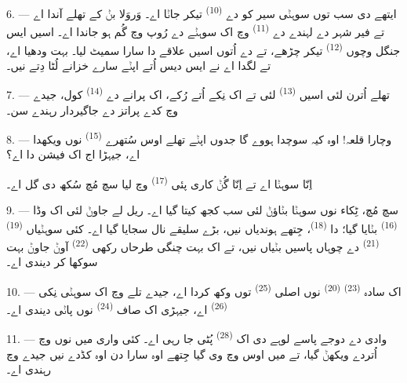 \VUsaut{3.0mm}
\VUsaut{3.0mm}

6. --- ایتھے دی سب توں سوہݨی سیر کو دے  \textsuperscript{(10)} تیکر
جاݨا اے۔  وَروَلا بݨ کے تھلے آندا اے تے فیر شہر دے لہندے دے
 \textsuperscript{(11)} وچ اک سوہݨے  دے رُوپ وچ
گُم ہو جاندا اے۔ اسیں ایس جنگل وچوں  \textsuperscript{(12)}
تیکر چڑھے، تے  دے اُتوں اسیں علاقے دا سارا 
سمیٹ لیا۔  بہت ودھیا اے، تے لگدا اے  نے ایس دیس
اُتے اپݨے سارے خزانے لُٹا دِتے نیں۔

7. --- تھلے اُترن لئی اسیں  \textsuperscript{(13)} لئی تے اک
نِکے  اُتے رُکے، اک پرانے  دے
 \textsuperscript{(14)} کول، جیدے وچ کدے پراتز دے جاگیردار رہندے سن۔

8. --- وچارا قلعہ! اوہ کیہ سوچدا ہووے گا جدوں اپݨے تھلے اوس سُتھرے
 \textsuperscript{(15)} نوں ویکھدا اے، جیہڑا اج اک فیشن دا
 اے؟

 اِنّا سوہݨا اے تے  اِنّا گُݨ کاری پئی
 \textsuperscript{(17)} وچ لیا  سچ مُچ سُکھ دی گل
اے۔

\VUsaut{3.0mm}
\VUsaut{3.0mm}

9. --- سچ مُچ، ٹِکاء نوں سوہݨا بݨاؤݨ لئی سب کجھ کیتا گیا اے۔ ریل لے جاوݨ لئی اک
وڈا  \textsuperscript{(16)} بݨایا گیا؛  دا
 \textsuperscript{(18)}، جِتھے  ہوندیاں نیں،
بڑے سلیقے نال سجایا گیا اے۔ کئی سوہݨیاں  \textsuperscript{(19)}
 \textsuperscript{(21)} دے چوہاں پاسیں بݨیاں نیں، تے اک بہت چنگی
طرحاں رکھی  \textsuperscript{(22)} آوݨ جاوݨ بہت سوکھا کر دیندی اے۔

10. --- اک سادہ  \textsuperscript{(23)} 
\textsuperscript{(20)} نوں اصلی  \textsuperscript{(25)} توں وکھ کردا اے،
جیدے تلے وچ اک سوہݨی نِکی  \textsuperscript{(26)} اے، جیہڑی اک صاف
 \textsuperscript{(24)} نوں پاݨی دیندی اے۔

11. --- وادی دے دوجے پاسے لوہے دی اک  \textsuperscript{(28)} پُٹی جا
رہی اے۔ کئی واری میں  نوں  وچ اُتردے ویکھݨ گیا، تے
میں اوس  وچ وی گیا جِتھے اوہ سارا دن اوہ  کڈدے نیں
جیدے وچ  رہندی اے۔

